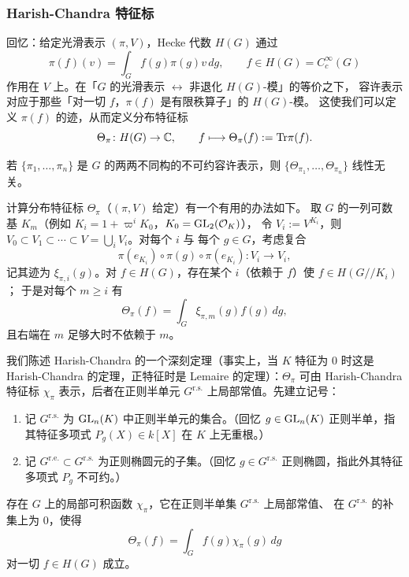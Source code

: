 \subsubsection{Harish-Chandra 特征标}

回忆：给定光滑表示 $(\pi,V)$，Hecke 代数 $H(G)$ 通过
\[
\pi(f)(v)=\int_G f(g)\pi(g)v\,dg,\qquad f\in H(G)=C^{\infty}_c(G)
\]
作用在 $V$ 上。在「$G$ 的光滑表示 $\leftrightarrow$ 非退化 $H(G)$-模」的等价之下，
容许表示对应于那些「对一切 $f$，$\pi(f)$ 是有限秩算子」的 $H(G)$-模。
这使我们可以定义 $\pi(f)$ 的迹，从而定义分布特征标
\[
\Theta_{\pi}\colon H(G)\to\mathbb{C},\qquad f\longmapsto\Theta_{\pi}(f):=\mathrm{Tr}\pi(f).
\]

\begin{lemma}
若 $\{\pi_1,\dots,\pi_n\}$ 是 $G$ 的两两不同构的不可约容许表示，则
$\{\Theta_{\pi_1},\dots,\Theta_{\pi_n}\}$ 线性无关。
\end{lemma}

\begin{remark}
计算分布特征标 $\Theta_{\pi}$（$(\pi,V)$ 给定）有一个有用的办法如下。
取 $G$ 的一列可数基 $K_m$（例如 $K_i=1+\varpi^{i}K_0$，$K_0=\mathrm{GL}_2(\mathcal{O}_K)$），
令 $V_i:=V^{K_i}$，则 $V_0\subset V_1\subset\cdots\subset V=\bigcup_iV_i$。对每个 $i$ 与
每个 $g\in G$，考虑复合
\[
\pi(e_{K_i})\circ\pi(g)\circ\pi(e_{K_i})\colon V_i\longrightarrow V_i,
\]
记其迹为 $\xi_{\pi,i}(g)$。对 $f\in H(G)$，存在某个 $i$（依赖于 $f$）使 $f\in H(G/\!/K_i)$；
于是对每个 $m\ge i$ 有
\[
\Theta_{\pi}(f)=\int_G\xi_{\pi,m}(g)f(g)\,dg,
\]
且右端在 $m$ 足够大时不依赖于 $m$。
\end{remark}

我们陈述 Harish-Chandra 的一个深刻定理（事实上，当 $K$ 特征为 $0$ 时这是 Harish-Chandra
的定理，正特征时是 Lemaire 的定理）：$\Theta_{\pi}$ 可由 Harish-Chandra 特征标
$\chi_{\pi}$ 表示，后者在正则半单元 $G^{\mathrm{r.s.}}$ 上局部常值。先建立记号：
\begin{enumerate}[label=(\arabic*),leftmargin=2.2em]
\item 记 $G^{\mathrm{r.s.}}$ 为 $\mathrm{GL}_n(K)$ 中正则半单元的集合。（回忆 $g\in\mathrm{GL}_n(K)$
      正则半单，指其特征多项式 $P_g(X)\in k[X]$ 在 $K$ 上无重根。）
\item 记 $G^{\mathrm{r.e.}}\subset G^{\mathrm{r.s.}}$ 为正则椭圆元的子集。（回忆
      $g\in G^{\mathrm{r.s.}}$ 正则椭圆，指此外其特征多项式 $P_g$ 不可约。）
\end{enumerate}

\begin{theorem}
存在 $G$ 上的局部可积函数 $\chi_{\pi}$，它在正则半单集 $G^{\mathrm{r.s.}}$ 上局部常值、
在 $G^{\mathrm{r.s.}}$ 的补集上为 $0$，使得
\[
\Theta_{\pi}(f)=\int_G f(g)\chi_{\pi}(g)\,dg
\]
对一切 $f\in H(G)$ 成立。
\end{theorem}

